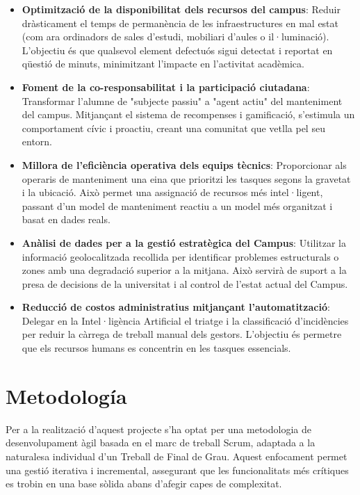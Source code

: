 \documentclass[10pt,a4paper,twocolumn,twoside]{article}
\begin{document}
		
		\begin{itemize}
			\item \textbf{Optimització de la disponibilitat dels recursos del campus}: Reduir dràsticament el temps de permanència de les infraestructures en mal estat (com ara ordinadors de sales d'estudi, mobiliari d'aules o il·luminació). L'objectiu és que qualsevol element defectuós sigui detectat i reportat en qüestió de minuts, minimitzant l'impacte en l'activitat acadèmica.
			
			\item \textbf{Foment de la co-responsabilitat i la participació ciutadana}: Transformar l'alumne de "subjecte passiu" a "agent actiu" del manteniment del campus. Mitjançant el sistema de recompenses i gamificació, s'estimula un comportament cívic i proactiu, creant una comunitat que vetlla pel seu entorn.
			
			\item \textbf{Millora de l'eficiència operativa dels equips tècnics}: Proporcionar als operaris de manteniment una eina que prioritzi les tasques segons la gravetat i la ubicació. Això permet una assignació de recursos més intel·ligent, passant d'un model de manteniment reactiu a un model més organitzat i basat en dades reals.
			
			\item \textbf{Anàlisi de dades per a la gestió estratègica del Campus}: Utilitzar la informació geolocalitzada recollida per identificar problemes estructurals o zones amb una degradació superior a la mitjana. Això servirà de suport a la presa de decisions de la universitat i al control de l'estat actual del Campus.
			
			\item \textbf{Reducció de costos administratius mitjançant l'automatització}: Delegar en la Intel·ligència Artificial el triatge i la classificació d'incidències per reduir la càrrega de treball manual dels gestors. L'objectiu és permetre que els recursos humans es concentrin en les tasques essencials.
			
		\end{itemize}
		
		\section{Metodología}
		Per a la realització d'aquest projecte s'ha optat per una metodologia de desenvolupament àgil basada en el marc de treball Scrum\cite{4}, adaptada a la naturalesa individual d'un Treball de Final de Grau. Aquest enfocament permet una gestió iterativa i incremental, assegurant que les funcionalitats més crítiques es trobin en una base sòlida abans d'afegir capes de complexitat.
		
\end{document}
